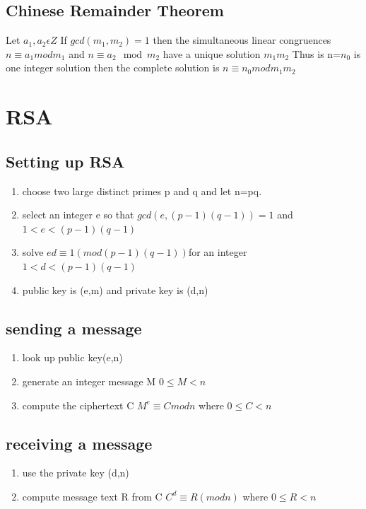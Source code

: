 \documentclass[12pt]{article}
\begin{document}
\subsection{Chinese Remainder Theorem}
Let $a_1, a_2 \epsilon Z$ If $gcd(m_1, m_2)=1$ then the simultaneous linear
congruences $n\equiv a_1mod m_1$ and $n\equiv a_2 \mod m_2 $ have a unique
solution \modulo $m_1m_2$ Thus is n=$n_0$ is one integer solution then the
complete solution is $n\equiv n_0 mod m_1 m_2$
\section{RSA}
\subsection{Setting up RSA}
\begin{enumerate}

  \item choose two large distinct primes p and q and let n=pq.
  \item select an integer e so that $gcd(e,(p-1)(q-1))=1$ and $1<e<(p-1)(q-1)$
  \item solve $ed\equiv 1(mod (p-1)(q-1))$for an integer $1<d<(p-1)(q-1)$
  \item public key is (e,m) and private key is (d,n)
\end{enumerate}
\subsection{sending a message}
\begin{enumerate}
  \item look up public key(e,n)
  \item generate an integer message M $0\leq M < n$
  \item compute the ciphertext C $M^e\equiv C mod n$ where $0\leq C < n$
\end{enumerate}
\subsection{receiving a message}
\begin{enumerate}
  \item use the private key (d,n)
  \item compute message text R from C $C^d\equiv R (mod n)$ where $0\leq R <n$
\end{enumerate}
\end{document}
